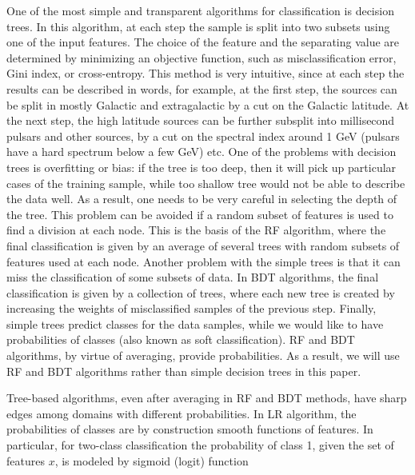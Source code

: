 One of the most simple and transparent algorithms for classification is decision trees.
In this algorithm, at each step the sample is split into two subsets using one of the input features.
The choice of the feature and the separating value are determined by minimizing an objective function, such as misclassification
error, Gini index, or cross-entropy.
This method is very intuitive, since at each step the results can be described in words, 
for example, at the first step, the sources can be split in mostly Galactic and extragalactic by a cut on the Galactic latitude.
At the next step, the high latitude sources can be further subsplit into millisecond pulsars and other sources, by a cut on the spectral index around 1 GeV (pulsars have a hard spectrum below a few GeV) etc.
One of the problems with decision trees is overfitting or bias: if the tree is too deep, then it will pick up particular cases of the training sample, while too shallow tree would not be able to describe the data well. As a result, one needs to be very careful in selecting the depth of the tree.
This problem can be avoided if a random subset of features is used to find a division at each node. This is the basis of the RF algorithm,
where the final classification is given by an average of several trees with random subsets of features used at each node.
Another problem with the simple trees is that it can miss the classification of some subsets of data. In BDT algorithms, the final classification is given by a collection of trees, where each new tree is created by increasing the weights of misclassified samples of the previous step. 
Finally, simple trees predict classes for the data samples, while we would like to have probabilities of classes (also known as soft classification).
RF and BDT algorithms, by virtue of averaging, provide probabilities. As a result, we will use RF and BDT algorithms rather than simple decision trees in this paper.

Tree-based algorithms, even after averaging in RF and BDT methods, have sharp edges among domains with different probabilities.
In LR algorithm, the probabilities of classes are by construction smooth functions of features.
In particular, for two-class classification the probability of class 1, given the set of features $x$, is modeled by sigmoid (logit) function

